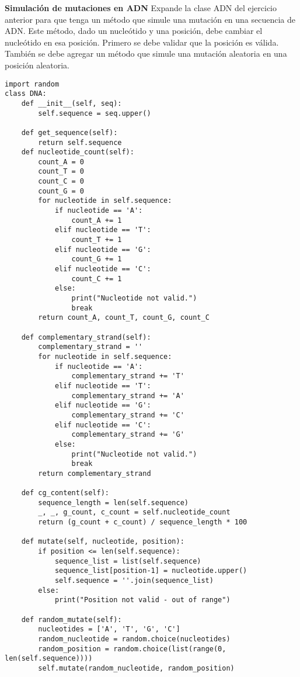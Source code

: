 \documentclass{config/ejercicios}
\begin{document}
\begin{problemS} \textbf{Simulación de mutaciones en ADN}
Expande la clase ADN del ejercicio anterior para que tenga un método que simule una mutación en una secuencia de ADN. Este método, dado un nucleótido y una posición, debe cambiar el nucleótido en esa posición.  Primero se debe validar que la posición es válida. También se debe agregar un método que simule una mutación aleatoria en una posición aleatoria.
\begin{lstlisting}
import random
class DNA:
    def __init__(self, seq):
        self.sequence = seq.upper()

    def get_sequence(self):
        return self.sequence
    def nucleotide_count(self):
        count_A = 0
        count_T = 0
        count_C = 0
        count_G = 0
        for nucleotide in self.sequence:
            if nucleotide == 'A':
                count_A += 1
            elif nucleotide == 'T':
                count_T += 1
            elif nucleotide == 'G':
                count_G += 1
            elif nucleotide == 'C':
                count_C += 1
            else:
                print("Nucleotide not valid.")
                break
        return count_A, count_T, count_G, count_C

    def complementary_strand(self):
        complementary_strand = ''
        for nucleotide in self.sequence:
            if nucleotide == 'A':
                complementary_strand += 'T'
            elif nucleotide == 'T':
                complementary_strand += 'A'
            elif nucleotide == 'G':
                complementary_strand += 'C'
            elif nucleotide == 'C':
                complementary_strand += 'G'
            else:
                print("Nucleotide not valid.")
                break
        return complementary_strand

    def cg_content(self):
        sequence_length = len(self.sequence)
        _, _, g_count, c_count = self.nucleotide_count
        return (g_count + c_count) / sequence_length * 100

    def mutate(self, nucleotide, position):
        if position <= len(self.sequence):
            sequence_list = list(self.sequence)
            sequence_list[position-1] = nucleotide.upper()
            self.sequence = ''.join(sequence_list)
        else:
            print("Position not valid - out of range")

    def random_mutate(self):
        nucleotides = ['A', 'T', 'G', 'C']
        random_nucleotide = random.choice(nucleotides)
        random_position = random.choice(list(range(0, len(self.sequence))))
        self.mutate(random_nucleotide, random_position)       
\end{lstlisting}
\end{problemS}
\end{document}
